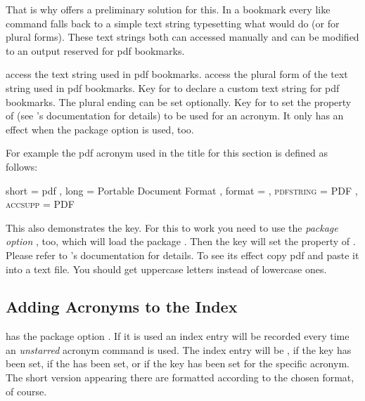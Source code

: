 \documentclass[DIV10,toc=index,toc=bib,hyperfootnotes=false]{cnpkgdoc}
\makeatletter
\providecommand*\sinceversion[1]{%
  \@bsphack
  \marginnote{%
    \footnotesize\sffamily\RaggedRight
    \textcolor{black!75}{Introduced in version~#1}}%
  \@esphack}
\makeatother
\begin{document}
That is why \acro offers a preliminary solution for this. In a bookmark every
 like command falls back to a simple text string typesetting what 
would do (or  for plural forms). These text strings both can accessed
manually and can be modified to an output reserved for \acs{pdf} bookmarks.

\begin{beschreibung}
 \newline
   access the text string used in \acs{pdf} bookmarks.
 \newline
   access the plural form of the text string used in \acs{pdf} bookmarks.
 \newline
   Key for  to declare a custom text string for \acs{pdf}
   bookmarks. The plural ending can be set optionally.
 \newline
   \sinceversion{1.0}Key for  to set the 
   property of  (see 's documentation for details)
   to be used for an acronym. It only has an effect when the package option 
   is used, too.
\end{beschreibung}

For example the \acs{pdf} acronym used in the title for this section is defined
as follows:
\begin{beispiel}
  {
    short     = pdf ,
    long      = Portable Document Format ,
    format    = \scshape ,
    pdfstring = PDF ,
    accsupp   = PDF
  }
\end{beispiel}

This also demonstrates the  key. For this to work you need to use
the \emph{package option} , too, which will load the package
. Then the key  will set the 
property of . Please refer to 's documentation
for details. To see its effect copy \ac{pdf} and paste it into a text file. You
should get uppercase letters instead of lowercase ones.

\subsection{Adding Acronyms to the Index}\label{ssec:index}
\noindent\sinceversion{1.1}\acro has the package option . If it is
used an index entry will be recorded every time an \emph{unstarred} acronym
command is used. The index entry will be , 
if the  key has been set, if the
 has been set, or  if the key  has been
set for the specific acronym. The short version appearing there are formatted
according to the chosen format, of course.
\end{document}
